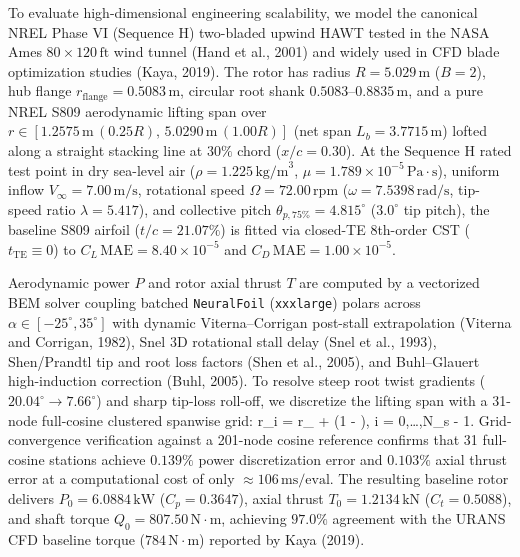 \documentclass[11pt,fleqn,letterpaper]{article}
\begin{document}
To evaluate high-dimensional engineering scalability, we model the canonical NREL Phase VI (Sequence H) two-bladed upwind HAWT tested in the NASA Ames $80 \times 120\,\text{ft}$ wind tunnel (Hand et al., 2001) and widely used in CFD blade optimization studies (Kaya, 2019). The rotor has radius $R = 5.029\,\text{m}$ ($B=2$), hub flange $r_{\text{flange}} = 0.5083\,\text{m}$, circular root shank $0.5083\text{--}0.8835\,\text{m}$, and a pure NREL S809 aerodynamic lifting span over $r \in [1.2575\,\text{m}\,(0.25R),\, 5.0290\,\text{m}\,(1.00R)]$ (net span $L_b = 3.7715\,\text{m}$) lofted along a straight stacking line at $30\%$ chord ($x/c = 0.30$). At the Sequence H rated test point in dry sea-level air ($\rho = 1.225\,\text{kg/m}^3$, $\mu = 1.789 \times 10^{-5}\,\text{Pa}\cdot\text{s}$), uniform inflow $V_\infty = 7.00\,\text{m/s}$, rotational speed $\Omega = 72.00\,\text{rpm}$ ($\omega = 7.5398\,\text{rad/s}$, tip-speed ratio $\lambda = 5.417$), and collective pitch $\theta_{p,75\%} = 4.815^\circ$ ($3.0^\circ$ tip pitch), the baseline S809 airfoil ($t/c = 21.07\%$) is fitted via closed-TE 8th-order CST ($t_{\text{TE}} \equiv 0$) to $C_L\,\text{MAE} = 8.40 \times 10^{-5}$ and $C_D\,\text{MAE} = 1.00 \times 10^{-5}$.

Aerodynamic power $P$ and rotor axial thrust $T$ are computed by a vectorized BEM solver coupling batched \texttt{NeuralFoil} (\texttt{xxxlarge}) polars across $\alpha \in [-25^\circ, 35^\circ]$ with dynamic Viterna--Corrigan post-stall extrapolation (Viterna and Corrigan, 1982), Snel 3D rotational stall delay (Snel et al., 1993), Shen/Prandtl tip and root loss factors (Shen et al., 2005), and Buhl--Glauert high-induction correction (Buhl, 2005). To resolve steep root twist gradients ($20.04^\circ \to 7.66^\circ$) and sharp tip-loss roll-off, we discretize the lifting span with a 31-node full-cosine clustered spanwise grid:
\be
r_i = r_{} + \left(1 - \cos{}\right), \quad i = 0,\dots,N_s - 1.
\label{eq:cosine_grid}
\ee
Grid-convergence verification against a 201-node cosine reference confirms that 31 full-cosine stations achieve $0.139\%$ power discretization error and $0.103\%$ axial thrust error at a computational cost of only $\approx 106\,\text{ms/eval}$. The resulting baseline rotor delivers $P_0 = 6.0884\,\text{kW}$ ($C_p = 0.3647$), axial thrust $T_0 = 1.2134\,\text{kN}$ ($C_t = 0.5088$), and shaft torque $Q_0 = 807.50\,\text{N}\cdot\text{m}$, achieving $97.0\%$ agreement with the URANS CFD baseline torque ($784\,\text{N}\cdot\text{m}$) reported by Kaya (2019).
\end{document}
